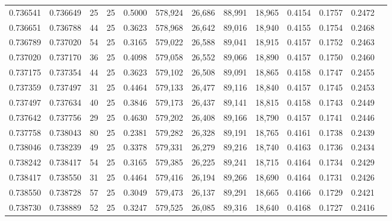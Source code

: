 \begin{tabular}{rrrrrrrrrrrrr}
0.736541 & 0.736649 &    25 &  25 &                                     0.5000 & 578,924 &  26,686 &  88,991 &  18,965 & 0.4154 & 0.1757 & 0.2472 \\
0.736651 & 0.736788 &    44 &  25 &                                     0.3623 & 578,968 &  26,642 &  89,016 &  18,940 & 0.4155 & 0.1754 & 0.2468 \\
0.736789 & 0.737020 &    54 &  25 &                                     0.3165 & 579,022 &  26,588 &  89,041 &  18,915 & 0.4157 & 0.1752 & 0.2463 \\
0.737020 & 0.737170 &    36 &  25 &                                     0.4098 & 579,058 &  26,552 &  89,066 &  18,890 & 0.4157 & 0.1750 & 0.2460 \\
0.737175 & 0.737354 &    44 &  25 &                                     0.3623 & 579,102 &  26,508 &  89,091 &  18,865 & 0.4158 & 0.1747 & 0.2455 \\
0.737359 & 0.737497 &    31 &  25 &                                     0.4464 & 579,133 &  26,477 &  89,116 &  18,840 & 0.4157 & 0.1745 & 0.2453 \\
0.737497 & 0.737634 &    40 &  25 &                                     0.3846 & 579,173 &  26,437 &  89,141 &  18,815 & 0.4158 & 0.1743 & 0.2449 \\
0.737642 & 0.737756 &    29 &  25 &                                     0.4630 & 579,202 &  26,408 &  89,166 &  18,790 & 0.4157 & 0.1741 & 0.2446 \\
0.737758 & 0.738043 &    80 &  25 &                                     0.2381 & 579,282 &  26,328 &  89,191 &  18,765 & 0.4161 & 0.1738 & 0.2439 \\
0.738046 & 0.738239 &    49 &  25 &                                     0.3378 & 579,331 &  26,279 &  89,216 &  18,740 & 0.4163 & 0.1736 & 0.2434 \\
0.738242 & 0.738417 &    54 &  25 &                                     0.3165 & 579,385 &  26,225 &  89,241 &  18,715 & 0.4164 & 0.1734 & 0.2429 \\
0.738417 & 0.738550 &    31 &  25 &                                     0.4464 & 579,416 &  26,194 &  89,266 &  18,690 & 0.4164 & 0.1731 & 0.2426 \\
0.738550 & 0.738728 &    57 &  25 &                                     0.3049 & 579,473 &  26,137 &  89,291 &  18,665 & 0.4166 & 0.1729 & 0.2421 \\
0.738730 & 0.738889 &    52 &  25 &                                     0.3247 & 579,525 &  26,085 &  89,316 &  18,640 & 0.4168 & 0.1727 & 0.2416 \\

\end{tabular}
